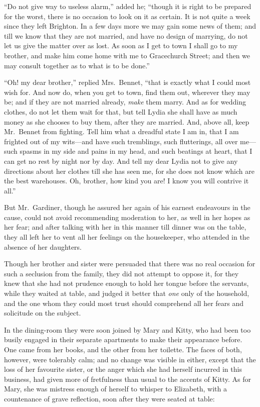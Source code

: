 ``Do not give way to useless alarm,'' added he; ``though it is
right to be prepared for the worst, there is no occasion to look
on it as certain.  It is not quite a week since they left Brighton.
In a few days more we may gain some news of them; and till we
know that they are not married, and have no design of marrying,
do not let us give the matter over as lost.  As soon as I get to
town I shall go to my brother, and make him come home with
me to Gracechurch Street; and then we may consult together as
to what is to be done.''

``Oh! my dear brother,'' replied Mrs.\ Bennet, ``that is exactly
what I could most wish for.  And now do, when you get to
town, find them out, wherever they may be; and if they are
not married already, \emph{make} them marry.  And as for wedding
clothes, do not let them wait for that, but tell Lydia she
shall have as much money as she chooses to buy them, after they
are married.  And, above all, keep Mr.\ Bennet from fighting.
Tell him what a dreadful state I am in, that I am frighted out
of my wits---and have such tremblings, such flutterings, all
over me---such spasms in my side and pains in my head, and
such beatings at heart, that I can get no rest by night nor by
day.  And tell my dear Lydia not to give any directions about
her clothes till she has seen me, for she does not know which
are the best warehouses.  Oh, brother, how kind you are!  I
know you will contrive it all.''

But Mr.\ Gardiner, though he assured her again of his earnest
endeavours in the cause, could not avoid recommending moderation
to her, as well in her hopes as her fear; and after talking with
her in this manner till dinner was on the table, they all left
her to vent all her feelings on the housekeeper, who attended
in the absence of her daughters.

Though her brother and sister were persuaded that there was no
real occasion for such a seclusion from the family, they did not
attempt to oppose it, for they knew that she had not prudence
enough to hold her tongue before the servants, while they
waited at table, and judged it better that \emph{one} only of the
household, and the one whom they could most trust should
comprehend all her fears and solicitude on the subject.

In the dining-room they were soon joined by Mary and Kitty,
who had been  too busily engaged in their separate apartments
to make their appearance before.  One came from her books,
and the other from her toilette.  The faces of both, however,
were tolerably calm; and no change was visible in either, except
that the loss of her favourite sister, or the anger which she had
herself incurred in this business, had given more of fretfulness
than usual to the accents of Kitty.  As for Mary, she was
mistress enough of herself to whisper to Elizabeth, with a
countenance of grave reflection, soon after they were seated
at table:

